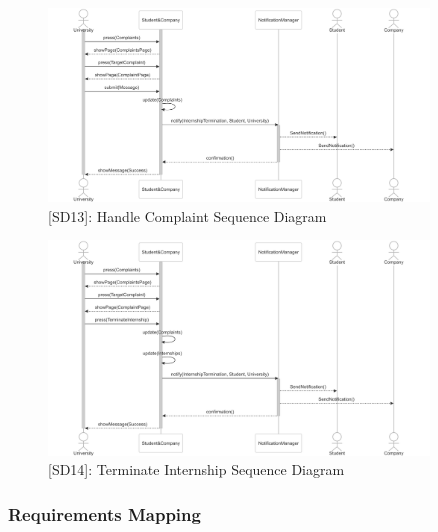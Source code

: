 \begin{figure}
    \centering
    \includegraphics[width=0.9\textwidth]{Latex/Images/HandleComplaintSequenceDiagram.png}
    \caption{[SD13]: Handle Complaint Sequence Diagram}
    \label{fig:SD13}
\end{figure}

\begin{figure}
    \centering
    \includegraphics[width=0.9\textwidth]{Latex/Images/TerminateInternshipSequenceDiagram.png}
    \caption{[SD14]: Terminate Internship Sequence Diagram}
    \label{fig:SD14}
\end{figure}
\clearpage

\subsubsection{Requirements Mapping}

